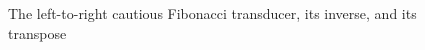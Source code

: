 \begin{figure}[ht]
\eee
\PushLine
\eee\ee
{}
\PushLine
\caption{The left-to-right cautious Fibonacci transducer, its 
inverse, and its transpose}
\label{fig:fib}
\end{figure}

